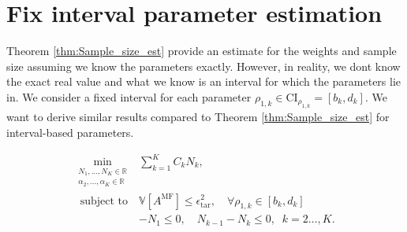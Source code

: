 \section{Fix interval parameter estimation}\label{sec:Fix_interval_parameter_est}
Theorem \eqref{thm:Sample_size_est} provide an estimate for the weights and sample size assuming we know the parameters exactly. However, in reality, we dont know the exact real value and what we know is an interval for which the parameters lie in. We consider a fixed interval for each parameter $\rho_{1,k}\in \text{CI}_{\rho_{1,k}}=[b_k,d_k]$. We want to derive similar results compared to Theorem \eqref{thm:Sample_size_est} for interval-based parameters.

%
\begin{equation}\label{eq:Optimization_pb_sample_size2}
    \begin{array}{ll}
    \min \limits_{\begin{array}{c}\scriptstyle N_1,\ldots, N_K\in \mathbb{R} \\[-4pt]
\scriptstyle \alpha_2,\ldots,\alpha_K\in \mathbb{R}
\end{array}} &\displaystyle\sum\limits_{k=1}^K C_kN_k,\\
       \;\,\text{subject to} &\mathbb{V}\left[A^{\text{MF}}\right]\le \epsilon_{\text{tar}}^2, \quad \forall \rho_{1,k} \in [b_k,d_k]\\[2pt]
       &\displaystyle -N_1\le 0,\quad \displaystyle N_{k-1}-N_k\le 0, \;\; k=2\ldots,K.
    \end{array}
\end{equation}
%




